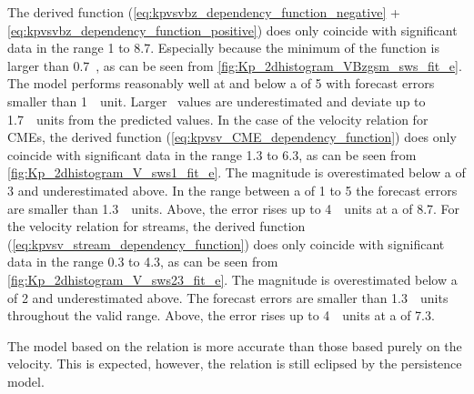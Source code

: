 The derived \vBz{} function (\ref{eq:kpvsvbz_dependency_function_negative} + \ref{eq:kpvsvbz_dependency_function_positive}) does only coincide with significant data in the \Kp{} range 1 to 8.7. Especially because the minimum of the \vBz{} function is larger than 0.7~\Kp{}, as can be seen from \autoref{fig:Kp_2dhistogram_VBzgsm_sws_fit_e}. The model performs reasonably well at and below a \Kp{} of 5 with forecast errors smaller than 1~\Kp~unit. Larger \Kp~values are underestimated and deviate up to 1.7~\Kp~units from the predicted values.
In the case of the velocity relation for CMEs, the derived function (\ref{eq:kpvsv_CME_dependency_function}) does only coincide with significant data in the \Kp{} range 1.3 to 6.3, as can be seen from \autoref{fig:Kp_2dhistogram_V_sws1_fit_e}. The magnitude is overestimated below a \Kp{} of 3 and underestimated above. In the range between a \Kp{} of 1 to 5 the forecast errors are smaller than 1.3~\Kp~units. Above, the error rises up to 4~\Kp~units at a \Kp{} of 8.7.
For the velocity relation for streams, the derived function (\ref{eq:kpvsv_stream_dependency_function}) does only coincide with significant data in the \Kp{} range 0.3 to 4.3, as can be seen from \autoref{fig:Kp_2dhistogram_V_sws23_fit_e}. The magnitude is overestimated below a \Kp{} of 2 and underestimated above. The forecast errors are smaller than 1.3~\Kp~units throughout the valid range. Above, the error rises up to 4~\Kp~units at a \Kp{} of 7.3.

The model based on the \vBz{} relation is more accurate than those based purely on the velocity. This is expected, however, the \vBz{} relation is still eclipsed by the persistence model.\\

